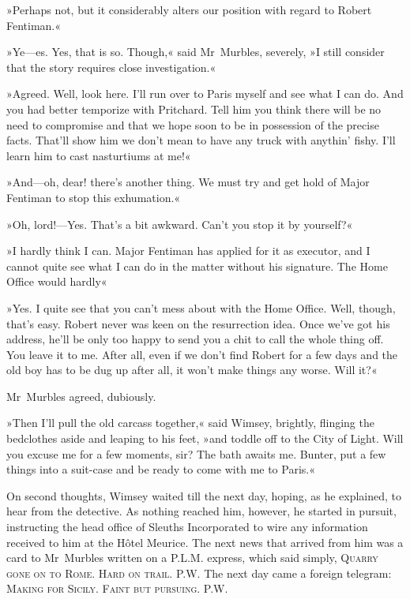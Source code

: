 »Perhaps not, but it considerably alters our position with regard to Robert Fentiman.«

»Ye—es. Yes, that is so. Though,« said Mr~Murbles, severely, »I still consider that the story requires close investigation.«

»Agreed. Well, look here. I'll run over to Paris myself and see what I can do. And you had better temporize with Pritchard. Tell him you think there will be no need to compromise and that we hope soon to be in possession of the precise facts. That'll show him we don't mean to have any truck with anythin' fishy. I'll learn him to cast nasturtiums at me!«

»And—oh, dear! there's another thing. We must try and get hold of Major Fentiman to stop this exhumation.«

»Oh, lord!—Yes. That's a bit awkward. Can't you stop it by yourself?«

»I hardly think I can. Major Fentiman has applied for it as executor, and I cannot quite see what I can do in the matter without his signature. The Home Office would hardly\longdash«

»Yes. I quite see that you can't mess about with the Home Office. Well, though, that's easy. Robert never was keen on the resurrection idea. Once we've got his address, he'll be only too happy to send you a chit to call the whole thing off. You leave it to me. After all, even if we don't find Robert for a few days and the old boy has to be dug up after all, it won't make things any worse. Will it?«

Mr~Murbles agreed, dubiously.

»Then I'll pull the old carcass together,« said Wimsey, brightly, flinging the bedclothes aside and leaping to his feet, »and toddle off to the City of Light. Will you excuse me for a few moments, sir? The bath awaits me. Bunter, put a few things into a suit-case and be ready to come with me to Paris.«

On second thoughts, Wimsey waited till the next day, hoping, as he explained, to hear from the detective. As nothing reached him, however, he started in pursuit, instructing the head office of Sleuths Incorporated to wire any information received to him at the Hôtel Meurice. The next news that arrived from him was a card to Mr~Murbles written on a P.L.M. express, which said simply, \textsc{Quarry gone on to Rome. Hard on trail. P.W.} The next day came a foreign telegram: \textsc{Making for Sicily. Faint but pursuing. P.W.}

